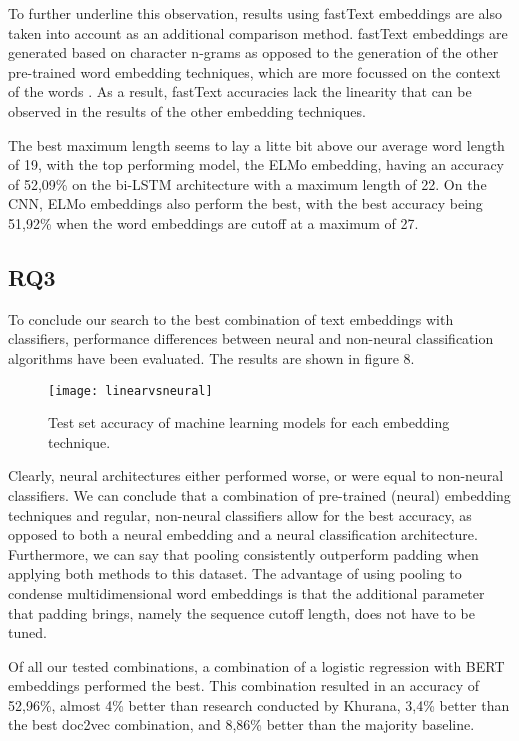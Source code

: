 To further underline this observation, results using fastText embeddings are also taken into account as an additional comparison method.
fastText embeddings are generated based on character n-grams as opposed to the generation of the other pre-trained word embedding techniques, which are more focussed on the context of the words \cite{bojanowski2017}.
As a result, fastText accuracies lack the linearity that can be observed in the results of the other embedding techniques. 

The best maximum length seems to lay a litte bit above our average word length of 19, with the top performing model, the ELMo embedding, having an accuracy of 52,09\% on the bi-LSTM architecture with a maximum length of 22.
On the CNN, ELMo embeddings also perform the best, with the best accuracy being 51,92\% when the word embeddings are cutoff at a maximum of 27. 

\subsection{RQ3}
To conclude our search to the best combination of text embeddings with classifiers, performance differences between neural and non-neural classification algorithms have been evaluated.
The results are shown in figure 8. 

\begin{figure}[h]
    \centering
    \texttt{[image: linearvsneural]}
    \caption{Test set accuracy of machine learning models for each embedding technique.}
\end{figure}

Clearly, neural architectures either performed worse, or were equal to non-neural classifiers. 
We can conclude that a combination of pre-trained (neural) embedding techniques and regular, non-neural classifiers allow for the best accuracy, as opposed to both a neural embedding and a neural classification architecture.
Furthermore, we can say that pooling consistently outperform padding when applying both methods to this dataset.
The advantage of using pooling to condense multidimensional word embeddings is that the additional parameter that padding brings, namely the sequence cutoff length, does not have to be tuned.

Of all our tested combinations, a combination of a logistic regression with BERT embeddings performed the best. 
This combination resulted in an accuracy of 52,96\%, almost 4\% better than research conducted by Khurana, 3,4\% better than the best doc2vec combination, and 8,86\% better than the majority baseline.

